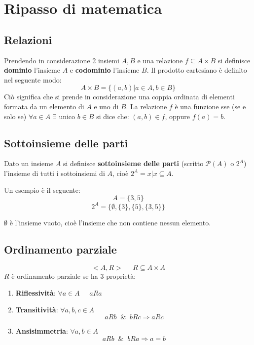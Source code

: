 \documentclass{article}
\theoremstyle{break}
\theoremstyle{break}
\theoremstyle{break}
\theoremstyle{break}
\begin{document}


\tableofcontents
\pagebreak

\section{Ripasso di matematica}
\subsection{Relazioni}
Prendendo in considerazione 2 insiemi \( A, B \) e una relazione \( f \subseteq A\times B \)
si definisce \textbf{dominio} l'insieme \( A \) e \textbf{codominio} l'insieme \( B \).
Il prodotto cartesiano è definito nel seguente modo:
\[
	A \times B = \{(a,b) | a \in A, b \in B\}
\]
Ciò significa che si prende in considerazione una coppia ordinata di elementi formata da
un elemento di \( A \) e uno di \( B \).
La relazione \( f \) è una funzione sse (se e solo se) \( \forall a \in A \) \( \exists \) unico \( b \in B \)
si dice che: \( (a,b) \in f \), oppure \( f(a) = b \).

\subsection{Sottoinsieme delle parti}
Dato un insieme \( A \) si definisce \textbf{sottoinsieme delle parti} (scritto \( \mathcal{P}(A) \) o \( 2^{A} \))
l'insieme di tutti i sottoinsiemi di \( A \), cioè \( 2^{A} = {x|x \subseteq A} \).

Un esempio è il seguente:
\[
	A = \{3, 5\}
\]
\[
	2^{A} = \{ \emptyset, \{3\}, \{5\}, \{3,5\} \}
\]

\( \emptyset \) è l'insieme vuoto, cioè l'insieme che non contiene nessun elemento.

\subsection{Ordinamento parziale}
\[
<A, R>\;\;\;\;\; R \subseteq A \times A
\] 
\( R \) è ordinamento parziale se ha 3 proprietà:
\begin{enumerate}
  \item \textbf{Riflessività}: \( \forall a \in A\;\;\;\;\; aRa \) 
  \item \textbf{Transitività}: \( \forall a,b,c \in A \)
    \[
      aRb\;\; \&\;\; bRc \Rightarrow aRc
    \] 
  \item \textbf{Ansisimmetria}: \( \forall a,b \in A \) 
    \[
      aRb\;\; \& \;\; bRa \Rightarrow a=b
    \] 
\end{enumerate}
\end{document}
